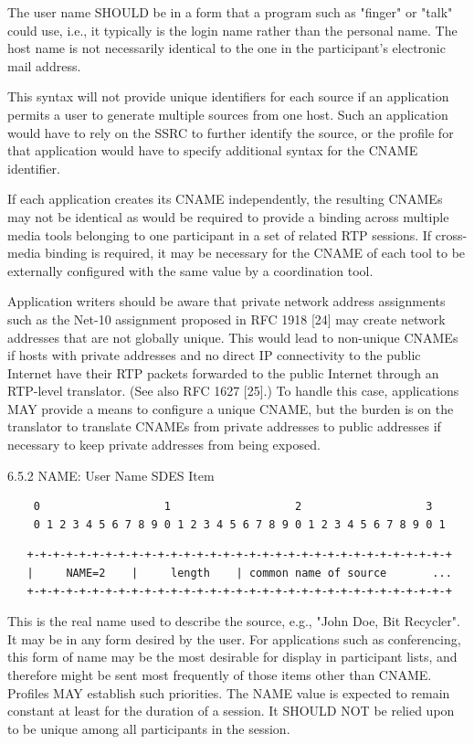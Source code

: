 \documentclass{article}
\begin{document}
\begin{itemize}
The user name SHOULD be in a form that a program such as "finger" or "talk" could use, i.e., it typically is the login name rather than the personal name.  The host name is not necessarily identical to the one in the participant's electronic mail address.

This syntax will not provide unique identifiers for each source if an application permits a user to generate multiple sources from one host.  Such an application would have to rely on the SSRC to further identify the source, or the profile for that application would have to specify additional syntax for the CNAME identifier.

If each application creates its CNAME independently, the resulting CNAMEs may not be identical as would be required to provide a binding across multiple media tools belonging to one participant in a set of related RTP sessions.  If cross-media binding is required, it may be necessary for the CNAME of each tool to be externally configured with the same value by a coordination tool.

Application writers should be aware that private network address assignments such as the Net-10 assignment proposed in RFC 1918 [24] may create network addresses that are not globally unique.  This would lead to non-unique CNAMEs if hosts with private addresses and no direct IP connectivity to the public Internet have their RTP packets forwarded to the public Internet through an RTP-level translator.  (See also RFC 1627 [25].)  To handle this case, applications MAY provide a means to configure a unique CNAME, but the burden is on the translator to translate CNAMEs from private addresses to public addresses if necessary to keep private addresses from being exposed.

\end{itemize}
6.5.2 NAME: User Name SDES Item

\begin{verbatim}
    0                   1                   2                   3
    0 1 2 3 4 5 6 7 8 9 0 1 2 3 4 5 6 7 8 9 0 1 2 3 4 5 6 7 8 9 0 1
\end{verbatim}

\begin{verbatim}
   +-+-+-+-+-+-+-+-+-+-+-+-+-+-+-+-+-+-+-+-+-+-+-+-+-+-+-+-+-+-+-+-+
   |     NAME=2    |     length    | common name of source       ...
   +-+-+-+-+-+-+-+-+-+-+-+-+-+-+-+-+-+-+-+-+-+-+-+-+-+-+-+-+-+-+-+-+
\end{verbatim}

This is the real name used to describe the source, e.g., "John Doe, Bit Recycler".  It may be in any form desired by the user.  For applications such as conferencing, this form of name may be the most desirable for display in participant lists, and therefore might be sent most frequently of those items other than CNAME.  Profiles MAY establish such priorities.  The NAME value is expected to remain constant at least for the duration of a session.  It SHOULD NOT be relied upon to be unique among all participants in the session.
\end{document}
